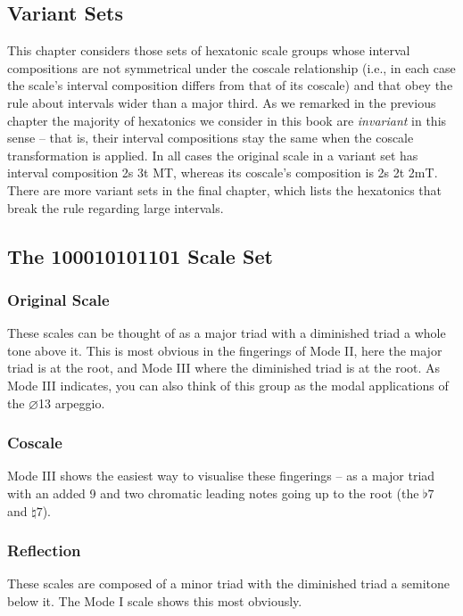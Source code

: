 \documentclass[english]{./gbook}
\begin{document}
\begin{large}
\chapter{\mbox{Variant} \mbox{Sets}}

This chapter considers those sets of hexatonic scale groups whose interval compositions are not symmetrical under the coscale relationship (i.e., in each case the scale's interval composition differs from that of its coscale) and that obey the rule about intervals wider than a major third. As we remarked in the previous chapter the majority of hexatonics we consider in this book are \emph{invariant} in this sense -- that is, their interval compositions stay the same when the coscale transformation is applied. In all cases the original scale in a variant set has interval composition 2s 3t MT, whereas its coscale's composition is 2s 2t 2mT. There are more variant sets in the final chapter, which lists the hexatonics that break the rule regarding large intervals.

\section{The 100010101101 Scale Set}
\subsection*{Original Scale}
These scales can be thought of as a major triad with a diminished triad a whole tone above it. This is most obvious in the fingerings of Mode II, here the major triad is at the root, and Mode III where the diminished triad is at the root. As Mode III indicates, you can also think of this group as the modal applications of the $\varnothing$13 arpeggio.

\subsection*{Coscale}
Mode III shows the easiest way to visualise these fingerings -- as a major triad with an added 9 and two chromatic leading notes going up to the root (the $\flat7$ and $\natural7$).

\subsection*{Reflection}
These scales are composed of a minor triad with the diminished triad a semitone below it. The Mode I scale shows this most obviously.


\end{large}
\end{document}
